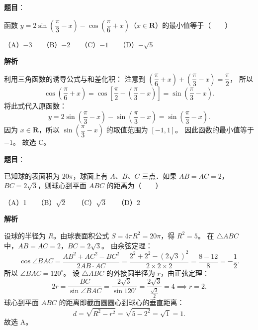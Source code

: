 \begin{answer}

\textbf{题目}：

函数 $y=2\sin\left(\dfrac{\pi}{3}-x\right)-\cos\left(\dfrac{\pi}{6}+x\right)$（$x\in\mathbf{R}$）的最小值等于\mbox{（　　）}

（A）$-3$　　（B）$-2$　　（C）$-1$　　（D）$-\sqrt{5}$

\textbf{解析}

利用三角函数的诱导公式与和差化积：
注意到 $\left(\dfrac{\pi}{6}+x\right)+\left(\dfrac{\pi}{3}-x\right)=\dfrac{\pi}{2}$，
所以
\nopagebreak[4]
\[
\cos\left(\frac{\pi}{6}+x\right)=\cos\left[\frac{\pi}{2}-\left(\frac{\pi}{3}-x\right)\right]=\sin\left(\frac{\pi}{3}-x\right).
\]
将此式代入原函数：
\nopagebreak[4]
\[
y=2\sin\left(\frac{\pi}{3}-x\right)-\sin\left(\frac{\pi}{3}-x\right)=\sin\left(\frac{\pi}{3}-x\right).
\]
因为 $x\in\mathbf{R}$，所以 $\sin\left(\dfrac{\pi}{3}-x\right)$ 的取值范围为 $[-1,1]$。
因此函数的最小值等于 $-1$。
故选 C。


\end{answer}
\begin{answer}

\textbf{题目}：

已知球的表面积为 $20\pi$，球面上有 $A$、$B$、$C$ 三点．如果 $AB=AC=2$，$BC=2\sqrt{3}$，则球心到平面 $ABC$ 的距离为\mbox{（　　）}

（A）1　　（B）$\sqrt{2}$　　（C）$\sqrt{3}$　　（D）2

\textbf{解析}

设球的半径为 $R$。由球表面积公式 $S=4\pi R^2=20\pi$，得 $R^2=5$。
在 $\triangle ABC$ 中，$AB=AC=2$，$BC=2\sqrt{3}$。
由余弦定理：
\nopagebreak[4]
\[
\cos\angle BAC=\frac{AB^2+AC^2-BC^2}{2AB\cdot AC}=\frac{2^2+2^2-(2\sqrt{3})^2}{2\times 2\times 2}=\frac{8-12}{8}=-\frac{1}{2}.
\]
所以 $\angle BAC=120^\circ$。
设 $\triangle ABC$ 的外接圆半径为 $r$，由正弦定理：
\nopagebreak[4]
\[
2r=\frac{BC}{\sin\angle BAC}=\frac{2\sqrt{3}}{\sin 120^\circ}=\frac{2\sqrt{3}}{\frac{\sqrt{3}}{2}}=4\implies r=2.
\]
球心到平面 $ABC$ 的距离即截面圆圆心到球心的垂直距离：
\nopagebreak[4]
\[
d=\sqrt{R^2-r^2}=\sqrt{5-2^2}=\sqrt{1}=1.
\]
故选 A。


\end{answer}
